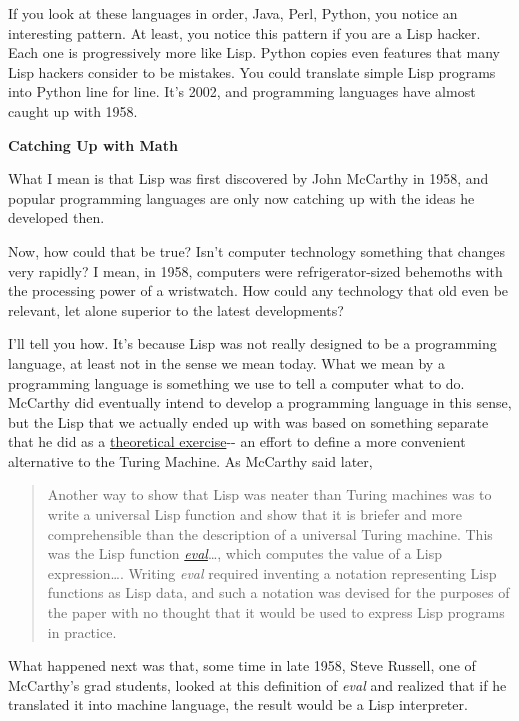 \documentclass[12pt]{book}
\begin{document}
If you look at these languages in order, Java, Perl, Python, you notice
an interesting pattern. At least, you notice this pattern if you are a
Lisp hacker. Each one is progressively more like Lisp. Python copies
even features that many Lisp hackers consider to be mistakes. You could
translate simple Lisp programs into Python line for line. It's 2002, and
programming languages have almost caught up with 1958.

\textbf{Catching Up with Math}

What I mean is that Lisp was first discovered by John McCarthy in 1958,
and popular programming languages are only now catching up with the
ideas he developed then.

Now, how could that be true? Isn't computer technology something that
changes very rapidly? I mean, in 1958, computers were refrigerator-sized
behemoths with the processing power of a wristwatch. How could any
technology that old even be relevant, let alone superior to the latest
developments?

I'll tell you how. It's because Lisp was not really designed to be a
programming language, at least not in the sense we mean today. What we
mean by a programming language is something we use to tell a computer
what to do. McCarthy did eventually intend to develop a programming
language in this sense, but the Lisp that we actually ended up with was
based on something separate that he did as a
\href{rootsoflisp.html}{theoretical exercise}-\/- an effort to define a
more convenient alternative to the Turing Machine. As McCarthy said
later,

\begin{quote}
Another way to show that Lisp was neater than Turing machines was to
write a universal Lisp function and show that it is briefer and more
comprehensible than the description of a universal Turing machine. This
was the Lisp function
\href{https://sep.turbifycdn.com/ty/cdn/paulgraham/jmc.lisp?t=1688221954&}{\emph{eval}}\ldots,
which computes the value of a Lisp expression\ldots. Writing \emph{eval}
required inventing a notation representing Lisp functions as Lisp data,
and such a notation was devised for the purposes of the paper with no
thought that it would be used to express Lisp programs in practice.
\end{quote}

What happened next was that, some time in late 1958, Steve Russell, one
of McCarthy's grad students, looked at this definition of \emph{eval}
and realized that if he translated it into machine language, the result
would be a Lisp interpreter.
\end{document}
